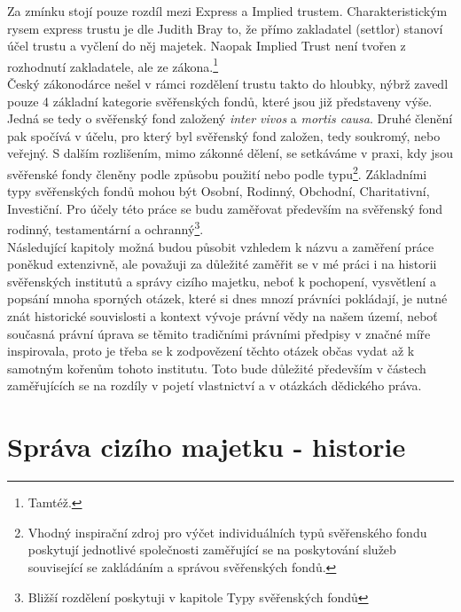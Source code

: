 \documentclass{article}
\begin{document}
\newpage

Za zmínku stojí pouze rozdíl mezi Express a Implied trustem. Charakteristickým rysem express trustu je dle Judith Bray to, že přímo zakladatel (settlor) stanoví účel trustu a vyčlení do něj majetek. Naopak Implied Trust není tvořen z rozhodnutí zakladatele, ale ze zákona.\footnote{Tamtéž.}\\

Český zákonodárce nešel v rámci rozdělení trustu takto do hloubky, nýbrž zavedl pouze 4 základní kategorie svěřenských fondů, které jsou již představeny výše. Jedná se tedy o svěřenský fond založený \textit{inter vivos} a \textit{mortis causa}. Druhé členění pak spočívá v účelu, pro který byl svěřenský fond založen, tedy soukromý, nebo veřejný. S dalším rozlišením, mimo zákonné dělení, se setkáváme v praxi, kdy jsou svěřenské fondy členěny podle způsobu použití nebo podle typu\footnote{Vhodný inspirační zdroj pro výčet individuálních typů svěřenského fondu poskytují jednotlivé společnosti zaměřující se na poskytování služeb související se zakládáním a správou svěřenských fondů.}. Základními typy svěřenských fondů mohou být Osobní, Rodinný, Obchodní, Charitativní, Investiční. Pro účely této práce se budu zaměřovat především na svěřenský fond rodinný, testamentární a ochranný\footnote{Bližší rozdělení poskytuji v kapitole Typy svěřenských fondů}.\\

Následující kapitoly možná budou působit vzhledem k názvu a zaměření práce poněkud extenzivně, ale považuji za důležité zaměřit se v mé práci i na historii svěřenských institutů a správy cizího majetku, neboť k pochopení, vysvětlení a popsání mnoha sporných otázek, které si dnes mnozí právníci pokládají, je nutné znát historické souvislosti a kontext vývoje právní vědy na našem území, neboť současná právní úprava se těmito tradičními právními předpisy v značné míře inspirovala, proto je třeba se k zodpovězení těchto otázek občas vydat až k samotným kořenům tohoto institutu. Toto bude důležité především v částech zaměřujících se na rozdíly v pojetí vlastnictví a v otázkách dědického práva.\\


\newpage

\section{Správa cizího majetku - historie}
\end{document}
